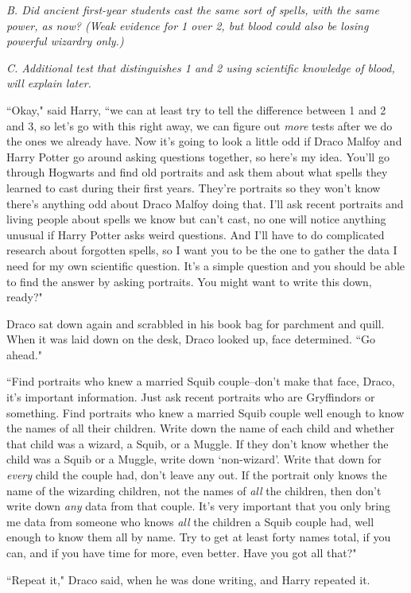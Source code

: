 \emph{B. Did ancient first-year students cast the same sort of spells, with the same power, as now? (Weak evidence for 1 over 2, but blood could also be losing powerful wizardry only.)}

\emph{C. Additional test that distinguishes 1 and 2 using scientific knowledge of blood, will explain later.}

``Okay," said Harry, ``we can at least try to tell the difference between 1 and 2 and 3, so let's go with this right away, we can figure out \emph{more} tests after we do the ones we already have. Now it's going to look a little odd if Draco Malfoy and Harry Potter go around asking questions together, so here's my idea. You'll go through Hogwarts and find old portraits and ask them about what spells they learned to cast during their first years. They're portraits so they won't know there's anything odd about Draco Malfoy doing that. I'll ask recent portraits and living people about spells we know but can't cast, no one will notice anything unusual if Harry Potter asks weird questions. And I'll have to do complicated research about forgotten spells, so I want you to be the one to gather the data I need for my own scientific question. It's a simple question and you should be able to find the answer by asking portraits. You might want to write this down, ready?"

Draco sat down again and scrabbled in his book bag for parchment and quill. When it was laid down on the desk, Draco looked up, face determined. ``Go ahead."

``Find portraits who knew a married Squib couple\---don't make that face, Draco, it's important information. Just ask recent portraits who are Gryffindors or something. Find portraits who knew a married Squib couple well enough to know the names of all their children. Write down the name of each child and whether that child was a wizard, a Squib, or a Muggle. If they don't know whether the child was a Squib or a Muggle, write down `non-wizard'. Write that down for \emph{every} child the couple had, don't leave any out. If the portrait only knows the name of the wizarding children, not the names of \emph{all} the children, then don't write down \emph{any} data from that couple. It's very important that you only bring me data from someone who knows \emph{all} the children a Squib couple had, well enough to know them all by name. Try to get at least forty names total, if you can, and if you have time for more, even better. Have you got all that?"

``Repeat it," Draco said, when he was done writing, and Harry repeated it.

